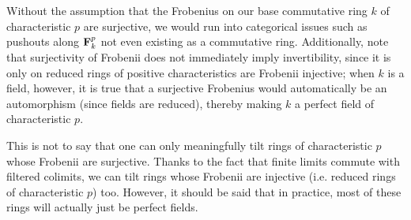                 \begin{remark} \label{remark: surjective_frobenii}
                    Without the assumption that the Frobenius on our base commutative ring $k$ of characteristic $p$ are surjective, we would run into categorical issues such as pushouts along $\mathbf{F}^p_k$ not even existing as a commutative ring. Additionally, note that surjectivity of Frobenii does not immediately imply invertibility, since it is only on reduced rings of positive characteristics are Frobenii injective; when $k$ is a field, however, it is true that a surjective Frobenius would automatically be an automorphism (since fields are reduced), thereby making $k$ a perfect field of characteristic $p$. 
                    
                    This is not to say that one can only meaningfully tilt rings of characteristic $p$ whose Frobenii are surjective. Thanks to the fact that finite limits commute with filtered colimits, we can tilt rings whose Frobenii are injective (i.e. reduced rings of characteristic $p$) too. However, it should be said that in practice, most of these rings will actually just be perfect fields. 
                \end{remark}
                
